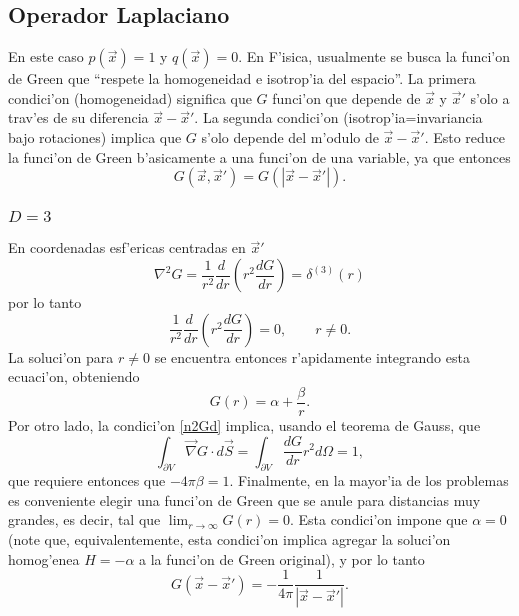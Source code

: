 \subsection{Operador Laplaciano}
En este caso $p(\vec{x})=1$ y $q(\vec{x})=0$. En F'isica, usualmente se busca la funci'on de Green que ``respete la homogeneidad e isotrop'ia del espacio''. La primera condici'on (homogeneidad) significa que $G$ funci'on que depende de $\vec{x}$ y $\vec{x}'$ s'olo a trav'es de su diferencia $\vec{x}-\vec{x}'$. La segunda condici'on (isotrop'ia=invariancia bajo rotaciones) implica que $G$ s'olo depende del m'odulo de $\vec{x}-\vec{x}'$. Esto reduce la funci'on de Green b'asicamente a una funci'on de una variable, ya que entonces
\begin{equation}
G(\vec{x},\vec{x}')=G(|\vec{x}-\vec{x}'|).
\end{equation}

\subsubsection{$D=3$}
En coordenadas esf'ericas centradas en $\vec{x}'$
\begin{equation}\label{n2Gd}
\nabla^2G=\frac{1}{r^2}\frac{d\ }{dr}\left(r^2\frac{dG}{dr}\right)=\delta^{(3)}(r)
\end{equation}
por lo tanto 
\begin{equation}
\frac{1}{r^2}\frac{d\ }{dr}\left(r^2\frac{dG}{dr}\right)=0, \qquad r\neq 0.
\end{equation}
La soluci'on para $r\neq 0$ se encuentra entonces r'apidamente integrando esta ecuaci'on, obteniendo
\begin{equation}
G(r)=\alpha+\frac{\beta}{r}.
\end{equation}
Por otro lado, la condici'on \eqref{n2Gd} implica, usando el teorema de Gauss, que
\begin{equation}
\int_{\partial V}\vec\nabla G\cdot d\vec{S}=\int_{\partial V}\frac{dG}{dr}r^2d\Omega=1,
\end{equation}
que requiere entonces que $-4\pi\beta=1$. Finalmente, en la mayor'ia de los problemas es conveniente elegir una funci'on de Green que se anule para distancias muy grandes, es decir, tal que $\lim_{r\to\infty}G(r)=0$. Esta condici'on impone que $\alpha=0$ (note que, equivalentemente, esta condici'on implica agregar la soluci'on homog'enea $H=-\alpha$ a la funci'on de Green original), y por lo tanto
\begin{equation}
\boxed{G(\vec{x}-\vec{x}')=-\frac{1}{4\pi}\frac{1}{|\vec{x}-\vec{x}'|}.}
\end{equation}

